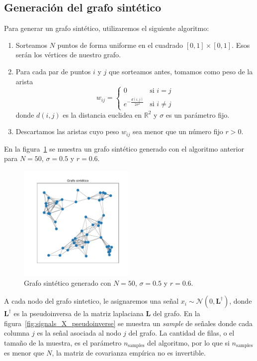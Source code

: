 \documentclass{article}
\begin{document}
\subsection{Generación del grafo sintético}

Para generar un grafo sintético, utilizaremos el siguiente algoritmo:
\begin{enumerate}
    \item Sorteamos $N$ puntos de forma uniforme en el cuadrado $[0,1] \times [0,1]$. Esos serán los vértices de nuestro grafo.
    \item Para cada par de puntos $i$ y $j$ que sorteamos antes, tomamos como peso de la arista
    \begin{equation*}
        w_{ij} = \begin{cases}
            0 & \text{si } i=j \\
            e^{-\frac{d(i,j)}{2\sigma^2}} & \text{si } i \neq j
        \end{cases}
    \end{equation*}
    donde $d(i,j)$ es la distancia euclidea en $\mathbb{R}^2$ y $\sigma$ es un parámetro fijo.
    \item Descartamos las aristas cuyo peso $w_{ij}$ sea menor que un número fijo $r>0$.
\end{enumerate}
En la figura~\ref{fig:grafo_sintetico} se muestra un grafo sintético generado con el algoritmo anterior para $N=50$, $\sigma=0.5$ y $r=0.6$.

\begin{figure}[htb]
    \centering
    \includegraphics[width=0.5\textwidth]{imagenes/grafo_sintetico.pdf}
    \caption{Grafo sintético generado con $N=50$, $\sigma=0.5$ y $r=0.6$.}
    \label{fig:grafo_sintetico}
\end{figure}

A cada nodo del grafo sintetico, le asignaremos una señal $x_i \sim \mathcal{N}(0, \mathbf{L}^\dagger)$, donde $\mathbf{L}^\dagger$ es la pseudoinversa de la matriz laplaciana $\mathbf{L}$ del grafo. En la figura~\ref{fig:signals_X_pseudoinverse} se muestra un \textit{sample} de señales
donde cada columna $j$ es la señal asociada al nodo $j$ del grafo. La cantidad de filas, o el tamaño de la muestra, es el parámetro $n_{\text{samples}}$ del algoritmo, por lo que si $n_{\text{samples}}$ es menor que $N$, la matriz de covarianza empírica no es invertible.
\end{document}
